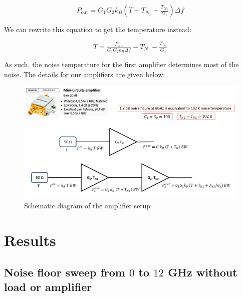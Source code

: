 \documentclass[english,12pt,a4paper]{article}
\begin{document}
 \begin{equation}
 	P_{\textrm{out}} = G_1G_2k_B\left(T+T_{N_1}+\tfrac{T_{N_2}}{G_1} \right)\Delta f
 \end{equation}
 
 We can rewrite this equation to get the temperature instead:
 
  \begin{equation}
 	T = \tfrac{P_{\textrm{out}}}{G_1G_2k_B\Delta f} -T_{N_1} -\tfrac{T_{N_2}}{G_1} 
 \end{equation}
 
 As such, the noise temperature for the first amplifier determines most of the noise. The details for our amplifiers are given below:
 
\begin{figure}[H]
	\includegraphics[width=1\linewidth]{"noise of minicircuits amplifier chain"}
	\caption{Schematic diagram of the amplifier setup}
	\label{fig:noise-of-minicircuits-amplifier-chain}
\end{figure}
\section{Results}
\hypertarget{noise-floor-sweep-from-0-to-12-ghz-without-load-or-amplifier}{%
	\subsection{\texorpdfstring{Noise floor sweep from \(0\) to \(12\) GHz
			without load or
			amplifier}{Noise floor sweep from 0 to 12 GHz without load or amplifier}}\label{noise-floor-sweep-from-0-to-12-ghz-without-load-or-amplifier}}
\end{document}
